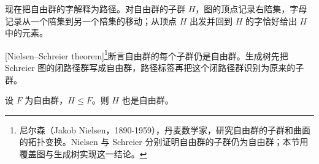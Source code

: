 现在把自由群的字解释为路径。对自由群的子群 \(H\)，图的顶点记录右陪集，字母记录从一个陪集到另一个陪集的移动；从顶点 \(H\) 出发并回到 \(H\) 的字恰好给出 \(H\) 中的元素。

\ProseParagraphBreak
{}[Nielsen--Schreier theorem]\footnote{尼尔森（Jakob Nielsen，1890-1959），丹麦数学家，研究自由群的子群和曲面的拓扑变换。Nielsen 与 Schreier 分别证明自由群的子群仍为自由群；本节用覆盖图与生成树实现这一结论。}断言自由群的每个子群仍是自由群。生成树先把 Schreier 图的闭路径群写成自由群，路径标签再把这个闭路径群识别为原来的子群。

\begin{theorem}\label{b1:thm:nielsen-schreier}
	设 \(F\) 为自由群，\(H\leq F\)。则 \(H\) 也是自由群。
\end{theorem}

